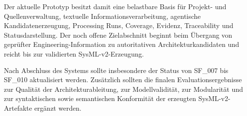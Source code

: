 Der aktuelle Prototyp besitzt damit eine belastbare Basis für
Projekt- und Quellenverwaltung, textuelle Informationsverarbeitung,
agentische Kandidatenerzeugung, Processing Runs, Coverage, Evidenz,
Traceability und Statusdarstellung. Der noch offene Zielabschnitt beginnt beim
Übergang von geprüfter Engineering-Information zu autoritativen
Architekturkandidaten und reicht bis zur validierten SysML-v2-Erzeugung.

\begin{tcolorbox}[
  enhanced,
  breakable,
  colback=gray!4,
  colframe=TuringSlate,
  title={Hinweis für die finale Fassung der Masterarbeit},
  fonttitle=\bfseries,
  arc=2mm
]
Nach Abschluss des Systems sollte insbesondere der Status von SF\_007 bis
SF\_010 aktualisiert werden. Zusätzlich sollten die finalen Evaluationsergebnisse
zur Qualität der Architekturableitung, zur Modellvalidität, zur Modularität und
zur syntaktischen sowie semantischen Konformität der erzeugten
SysML-v2-Artefakte ergänzt werden.
\end{tcolorbox}
